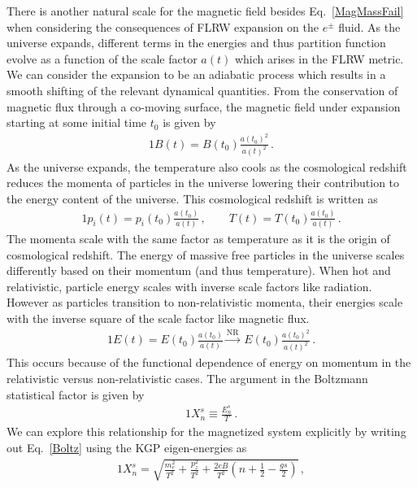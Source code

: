 \documentclass[
aps,
pra,
showpacs,
preprintnumbers,
amsmath,
amssymb,
footinbib
]{revtex4-2}
\newcommand*{\req}[1]{Eq.~{\eqref{#1}}}
\begin{document}
There is another natural scale for the magnetic field besides \req{MagMassFail} when considering the consequences of FLRW expansion on the $e^{\pm}$ fluid. As the universe expands, different terms in the energies and thus partition function evolve as a function of the scale factor $a(t)$ which arises in the FLRW metric. We can consider the expansion to be an adiabatic process which results in a smooth shifting of the relevant dynamical quantities. From the conservation of magnetic flux through a co-moving surface, the magnetic field under expansion starting at some initial time $t_{0}$ is given by
\begin{alignat}{1}
    \label{BScale} B(t) = B(t_{0})\frac{a(t_{0})^{2}}{a(t)^{2}}\,.
\end{alignat}
As the universe expands, the temperature also cools as the cosmological redshift reduces the momenta of particles in the universe lowering their contribution to the energy content of the universe. This cosmological redshift is written as
\begin{alignat}{1}
  \label{Redshift} p_{i}(t) = p_{i}(t_{0})\frac{a(t_{0})}{a(t)}\,,\qquad T(t) = T(t_{0})\frac{a(t_{0})}{a(t)}\,.
\end{alignat}
The momenta scale with the same factor as temperature as it is the origin of cosmological redshift. The energy of massive free particles in the universe scales differently based on their momentum (and thus temperature). When hot and relativistic, particle energy scales with inverse scale factors like radiation. However as particles transition to non-relativistic momenta, their energies scale with the inverse square of the scale factor like magnetic flux.
\begin{alignat}{1}
    \label{EScale} E(t) = E(t_{0})\frac{a(t_{0})}{a(t)}\xrightarrow{\mathrm{NR}}\  E(t_{0})\frac{a(t_{0})^{2}}{a(t)^{2}}\,.
\end{alignat}
This occurs because of the functional dependence of energy on momentum in the relativistic versus non-relativistic cases. The argument in the Boltzmann statistical factor is given by
\begin{alignat}{1}
    \label{Boltz} X_{n}^{s}\equiv\frac{E_{n}^{s}}{T}\,.
\end{alignat}
We can explore this relationship for the magnetized system explicitly by writing out \req{Boltz} using the KGP eigen-energies as
\begin{alignat}{1}
    \label{XExplicit} X_{n}^{s} = \sqrt{\frac{m_{e}^{2}}{T^{2}}+\frac{p_{z}^{2}}{T^{2}}+\frac{2eB}{T^{2}}\left(n+\frac{1}{2}-\frac{gs}{2}\right)}\,,
\end{alignat}
\end{document}
